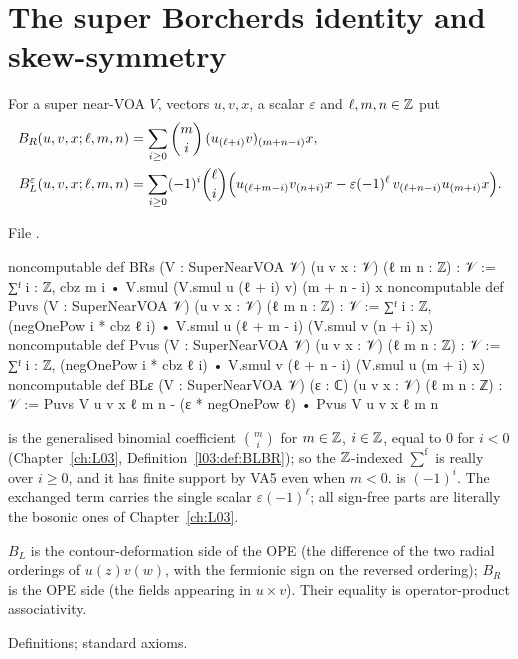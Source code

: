 \section{The super Borcherds identity and skew-symmetry}\label{l17:sec:borcherds}

\begin{definition}\label{l17:def:BLBR}
For a super near-VOA $V$, vectors $u,v,x$, a scalar $\varepsilon$ and $\ell,m,n\in{\mathbb{Z}}$ put
\begin{align*}
B_R(u,v,x;\ell,m,n)&=\sum_{i\ge0}\binom{m}{i}\,(u_{(\ell+i)}v)_{(m+n-i)}x,\\
B_L^\varepsilon(u,v,x;\ell,m,n)&=\sum_{i\ge0}(-1)^i\binom{\ell}{i}\Bigl(u_{(\ell+m-i)}v_{(n+i)}x
  -\varepsilon(-1)^\ell\,v_{(\ell+n-i)}u_{(m+i)}x\Bigr).
\end{align*}
\end{definition}
\noindent File .
\begin{leancode}
noncomputable def BRs (V : SuperNearVOA 𝒱) (u v x : 𝒱) (ℓ m n : ℤ) : 𝒱 :=
  ∑ᶠ i : ℤ, cbz m i • V.smul (V.smul u (ℓ + i) v) (m + n - i) x
noncomputable def Puvs (V : SuperNearVOA 𝒱) (u v x : 𝒱) (ℓ m n : ℤ) : 𝒱 :=
  ∑ᶠ i : ℤ, (negOnePow i * cbz ℓ i) • V.smul u (ℓ + m - i) (V.smul v (n + i) x)
noncomputable def Pvus (V : SuperNearVOA 𝒱) (u v x : 𝒱) (ℓ m n : ℤ) : 𝒱 :=
  ∑ᶠ i : ℤ, (negOnePow i * cbz ℓ i) • V.smul v (ℓ + n - i) (V.smul u (m + i) x)
noncomputable def BLε (V : SuperNearVOA 𝒱) (ε : ℂ) (u v x : 𝒱) (ℓ m n : ℤ) : 𝒱 :=
  Puvs V u v x ℓ m n - (ε * negOnePow ℓ) • Pvus V u v x ℓ m n
\end{leancode}
\begin{dictionary}
 is the generalised binomial coefficient $\binom mi$ for $m\in{\mathbb{Z}}$, $i\in{\mathbb{Z}}$, equal to
$0$ for $i<0$ (Chapter~\ref{ch:L03}, Definition~\ref{l03:def:BLBR}); so the ${\mathbb{Z}}$-indexed
 $\sum^{\mathrm f}$ is really over $i\ge0$, and it has finite support by VA5 even when
$m<0$.  is $(-1)^i$. The exchanged term carries the single scalar
$\varepsilon(-1)^\ell$; all sign-free parts are literally the bosonic ones of Chapter~\ref{ch:L03}.
\end{dictionary}
\begin{physics}
$B_L$ is the contour-deformation side of the OPE (the difference of the two radial orderings of
$u(z)v(w)$, with the fermionic sign on the reversed ordering); $B_R$ is the OPE side (the fields
appearing in $u\times v$). Their equality is operator-product associativity.
\end{physics}
\begin{status}
Definitions; standard axioms.
\end{status}

